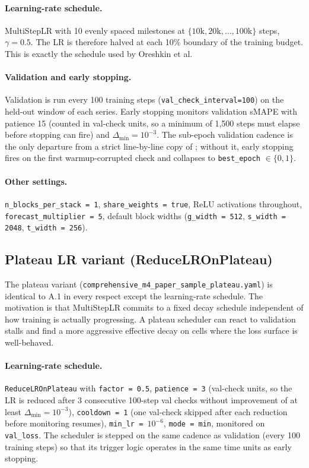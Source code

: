 \documentclass{article}
\begin{document}
\paragraph{Learning-rate schedule.} MultiStepLR with 10 evenly spaced milestones at $\{10\text{k}, 20\text{k}, \ldots, 100\text{k}\}$ steps, $\gamma = 0.5$. The LR is therefore halved at each 10\% boundary of the training budget. This is exactly the schedule used by Oreshkin et al.

\paragraph{Validation and early stopping.} Validation is run every 100 training steps (\texttt{val\_check\_interval=100}) on the held-out window of each series. Early stopping monitors validation sMAPE with patience 15 (counted in val-check units, so a minimum of 1{,}500 steps must elapse before stopping can fire) and $\Delta_{\min} = 10^{-3}$. The sub-epoch validation cadence is the only departure from a strict line-by-line copy of \citet{oreshkin2020nbeats}; without it, early stopping fires on the first warmup-corrupted check and collapses to \texttt{best\_epoch} $\in \{0, 1\}$.

\paragraph{Other settings.} \texttt{n\_blocks\_per\_stack = 1}, \texttt{share\_weights = true}, ReLU activations throughout, \texttt{forecast\_multiplier = 5}, default block widths (\texttt{g\_width = 512}, \texttt{s\_width = 2048}, \texttt{t\_width = 256}).

\subsection{Plateau LR variant (ReduceLROnPlateau)}

The plateau variant (\texttt{comprehensive\_m4\_paper\_sample\_plateau.yaml}) is identical to A.1 in every respect except the learning-rate schedule. The motivation is that MultiStepLR commits to a fixed decay schedule independent of how training is actually progressing. A plateau scheduler can react to validation stalls and find a more aggressive effective decay on cells where the loss surface is well-behaved.

\paragraph{Learning-rate schedule.} \texttt{ReduceLROnPlateau} with \texttt{factor = 0.5}, \texttt{patience = 3} (val-check units, so the LR is reduced after 3 consecutive 100-step val checks without improvement of at least $\Delta_{\min} = 10^{-3}$), \texttt{cooldown = 1} (one val-check skipped after each reduction before monitoring resumes), \texttt{min\_lr = $10^{-6}$}, \texttt{mode = min}, monitored on \texttt{val\_loss}. The scheduler is stepped on the same cadence as validation (every 100 training steps) so that its trigger logic operates in the same time units as early stopping.
\end{document}
